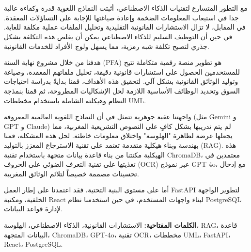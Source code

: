
\chapter*{}

\begin{RLtext}

مع التطور المتسارع لتقنيات الذكاء الاصطناعي، أثبتت النماذج اللغوية قدرة وكفاءة عالية جدا في استيعاب المعلومات الضخمة وإعادة صياغتها للإجابة على التساؤلات المعقدة. في المقابل، لا تزال الاستشارات القانونية التقليدية وتحليل الملفات عملية مكلفة للغاية. في حين أن التوظيف السليم للذكاء الاصطناعي يمكن أن يقلص هذه التكلفة بشكل جذري لتصبح تكلفة شبه رمزية، مما يسهل ولوج الأفراد للخدمات القانونية.

هدفنا من خلال مشروع نهاية السنة (PFA) هو تطوير منصة رقمية متكاملة تتيح للمستخدمين الحصول على استشارات قانونية دقيقة، تحليل ملفاتهم المعقدة، وصياغة وتوليد الوثائق القانونية بشكل آلي. لتحقيق هذه الأهداف، قمنا بدايةً بدراسة احتياجات السوق وتحديد الوظائف الأساسية اللازمة لحل الإشكاليات المطروحة، ثم قمنا بنمذجة النظام وهيكلته الشاملة باستخدام مخططات UML.

واجهتنا عقبة جوهرية تتمثل في أن النماذج اللغوية العالمية المعروفة (مثل Gemini و GPT و Claude) لم يتم تدريبها بشكل كافٍ على النصوص التشريعية المغربية، مما يجعلها عرضة لظاهرة "الهلوسة" واختلاق معلومات خاطئة. لحل هذه المشكلة، قمنا بهندسة وبناء هيكلية متقدمة تعتمد على تقنية الاسترجاع المعزز بالتوليد (RAG). هذه الهيكلية مكنتنا من بناء قاعدة بيانات متجهة باستخدام تقنية ChromaDB، معتمدين في تغذيتها على تقنية التعرف الضوئي على الحروف (OCR) عبر نموذج GPT-4o، مع إدخال تحسينات مصممة خصيصاً لتلائم الوثائق المغربية.

أما على مستوى البنية التحتية، فقد اعتمدنا على إطار العمل FastAPI لتطوير الواجهة الخلفية، ومكتبة React لبناء واجهات المستخدم، في حين استخدمنا نظام PostgreSQL لإدارة قواعد البيانات.

\vspace{0.5cm}

\textbf{الكلمات المفتاحية:} الاستشارات القانونية، الذكاء الاصطناعي، الهلوسة، RAG، قاعدة البيانات المتجهة، ChromaDB، GPT-4o، تقنية OCR، مخططات UML، FastAPI، React، PostgreSQL.

\end{RLtext}
